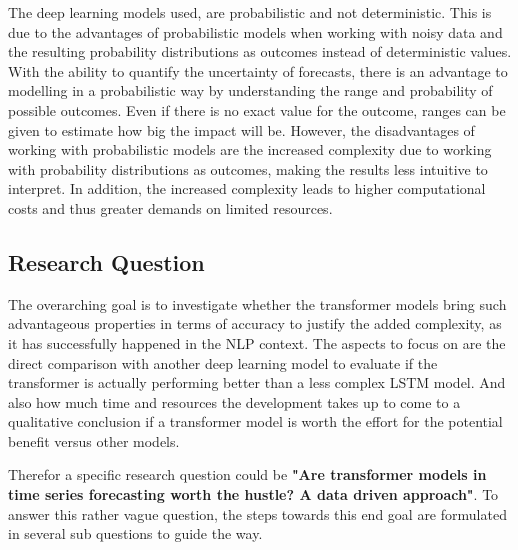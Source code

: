 \documentclass{article}
\begin{document}
The deep learning models used, are probabilistic and not deterministic. This is due to the advantages of probabilistic models when working with noisy data and the resulting probability distributions as outcomes instead of deterministic values. With the ability to quantify the uncertainty of forecasts, there is an advantage to modelling in a probabilistic way by understanding the range and probability of possible outcomes. Even if there is no exact value for the outcome, ranges can be given to estimate how big the impact will be.
However, the disadvantages of working with probabilistic models are the increased complexity due to working with probability distributions as outcomes, making the results less intuitive to interpret. In addition, the increased complexity leads to higher computational costs and thus greater demands on limited resources.

\subsection{Research Question}

The overarching goal is to investigate whether the transformer models bring such advantageous properties in terms of accuracy to justify the added complexity, as it has successfully happened in the NLP context. The aspects to focus on are the direct comparison with another deep learning model to evaluate if the transformer is actually performing better than a less complex LSTM model. And also how much time and resources the development takes up to come to a qualitative conclusion if a transformer model is worth the effort for the potential benefit versus other models. \par 
Therefor a specific research question could be \textbf{"Are transformer models in time series forecasting worth the hustle? A data driven approach"}. To answer this rather vague question, the steps towards this end goal are formulated in several sub questions to guide the way. 
\end{document}
